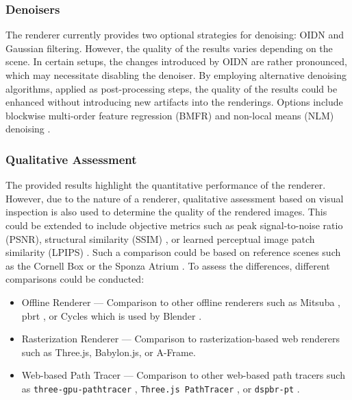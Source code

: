 \subsubsection*{Denoisers}

The renderer currently provides two optional strategies for denoising: \gls{OIDN} \cite{openImageDenoise} and Gaussian filtering. However, the quality of the results varies depending on the scene. In certain setups, the changes introduced by \gls{OIDN} are rather pronounced, which may necessitate disabling the denoiser. By employing alternative denoising algorithms, applied as post-processing steps, the quality of the results could be enhanced without introducing new artifacts into the renderings. Options include blockwise multi-order feature regression (BMFR) \cite{blockwise-multi-order-regresssion-for-rt-pt} and non-local means (NLM) denoising \cite{buadesNLMDenoising}.

\subsubsection*{Qualitative Assessment}

The provided results highlight the quantitative performance of the renderer. However, due to the nature of a renderer, qualitative assessment based on visual inspection is also used to determine the quality of the rendered images. This could be extended to include objective metrics such as peak signal-to-noise ratio (PSNR), structural similarity (SSIM) \cite{ssim}, or learned perceptual image patch similarity (LPIPS) \cite{lpips}. Such a comparison could be based on reference scenes such as the Cornell Box \cite{goral1984modeling} or the Sponza Atrium \cite{dabrovic2002sponza}. To assess the differences, different comparisons could be conducted:

\begin{itemize}
  \item{Offline Renderer} — Comparison to other offline renderers such as Mitsuba \cite{Jakob2020DrJit}, \gls{pbrt} \cite{Pharr_Physically_Based_Rendering_2023}, or Cycles which is used by \gls{Blender} \cite{cycles}.
  \item{Rasterization Renderer} — Comparison to rasterization-based web renderers such as \gls{Three.js}, \gls{Babylon.js}, or \gls{A-Frame}.
  \item{Web-based Path Tracer} — Comparison to other web-based path tracers such as \texttt{three-gpu-pathtracer} \cite{ThreeJsPathTracerJohnson}, \texttt{Three.js PathTracer} \cite{ThreeJsPathTracerLoftis}, or \texttt{dspbr-pt} \cite{PathTracerDassault}.
\end{itemize}

